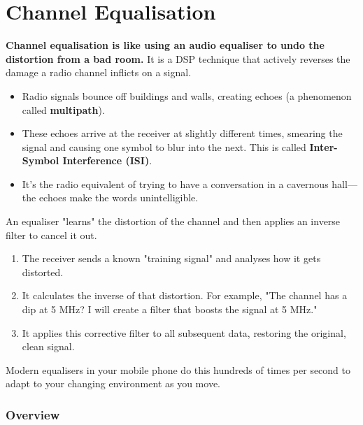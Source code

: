 
\chapter{Channel Equalisation}
\label{ch:equalisation}

\begin{nontechnical}
    \textbf{Channel equalisation is like using an audio equaliser to undo the distortion from a bad room.} It is a DSP technique that actively reverses the damage a radio channel inflicts on a signal.

    \begin{itemize}
        \item Radio signals bounce off buildings and walls, creating echoes (a phenomenon called \textbf{multipath}).
        \item These echoes arrive at the receiver at slightly different times, smearing the signal and causing one symbol to blur into the next. This is called \textbf{Inter-Symbol Interference (ISI)}.
        \item It's the radio equivalent of trying to have a conversation in a cavernous hall---the echoes make the words unintelligible.
    \end{itemize}

    An equaliser "learns" the distortion of the channel and then applies an inverse filter to cancel it out.
    \begin{enumerate}[label=\arabic*.]
        \item The receiver sends a known "training signal" and analyses how it gets distorted.
        \item It calculates the inverse of that distortion. For example, "The channel has a dip at 5 MHz? I will create a filter that boosts the signal at 5 MHz."
        \item It applies this corrective filter to all subsequent data, restoring the original, clean signal.
    \end{enumerate}
    Modern equalisers in your mobile phone do this hundreds of times per second to adapt to your changing environment as you move.
\end{nontechnical}


\subsection{Overview}

